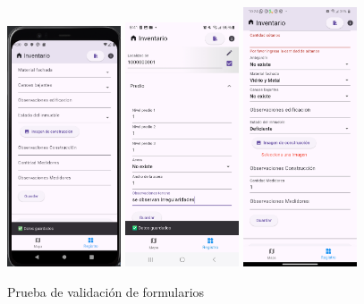 \begin{figure}[h]
    \includegraphics[width=0.3\textwidth]{Graphics/Capitulo 4/Pixel 4 [emulador]/4.4/1.png}
    \includegraphics[width=0.3\textwidth]{Graphics/Capitulo 4/Galaxy S23 Ultra Android/4.4/1.jpg}
    \includegraphics[width=0.3\textwidth]{Graphics/Capitulo 4/LG Android 13/4.4/2.png}
    \caption{Prueba de validación de formularios}
    \label{fig:figura22}
\end{figure}

